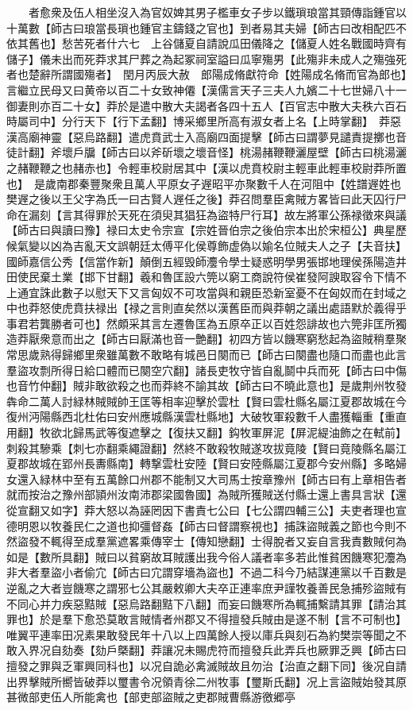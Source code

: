 　　者愈衆及伍人相坐沒入為官奴婢其男子檻車女子步以鐵瑣琅當其頸傳詣鍾官以十萬數【師古曰琅當長瑣也鍾官主鑄錢之官也】到者易其夫婦【師古曰改相配匹不依其舊也】愁苦死者什六七　上谷儲夏自請說瓜田儀降之【儲夏人姓名戰國時齊有儲子】儀未出而死莽求其尸葬之為起冢祠室謚曰瓜寧殤男【此殤非未成人之殤強死者也楚辭所謂國殤者】　閏月丙辰大赦　郎陽成脩獻符命【姓陽成名脩而官為郎也】言繼立民母又曰黄帝以百二十女致神僊【漢儒言天子三夫人九嬪二十七世婦八十一御妻則亦百二十女】莽於是遣中散大夫謁者各四十五人【百官志中散大夫秩六百石時屬司中】分行天下【行下孟翻】博采鄉里所高有淑女者上名【上時掌翻】　莽惡漢高廟神靈【惡烏路翻】遣虎賁武士入高廟四面提擊【師古曰謂夢見譴責提擲也音徒計翻】斧壞戶牖【師古曰以斧斫壞之壞音怪】桃湯赭鞭鞭灑屋壁【師古曰桃湯灑之赭鞭鞭之也赭赤也】令輕車校尉居其中【漢以虎賁校尉主輕車此輕車校尉莽所置也】　是歲南郡秦豐聚衆且萬人平原女子遟昭平亦聚數千人在河阻中【姓譜遟姓也樊遟之後以王父字為氏一曰古賢人遟任之後】莽召問羣臣禽賊方畧皆曰此天囚行尸命在漏刻【言其得罪於天死在須臾其猖狂為盜特尸行耳】故左將軍公孫禄徵來與議【師古曰與讀曰豫】禄曰太史令宗宣【宗姓晉伯宗之後伯宗本出於宋桓公】典星歷候氣變以凶為吉亂天文誤朝廷太傅平化侯尊飾虚偽以媮名位賊夫人之子【夫音扶】國師嘉信公秀【信當作新】顛倒五經毁師灋令學士疑惑明學男張邯地理侯孫陽造井田使民棄土業【邯下甘翻】羲和魯匡設六筦以窮工商說符侯崔發阿諛取容令下情不上通宜誅此數子以慰天下又言匈奴不可攻當與和親臣恐新室憂不在匈奴而在封域之中也莽怒使虎賁扶禄出【禄之言則直矣然以漢舊臣而與莽朝之議出處語默於義得乎事君若龔勝者可也】然頗采其言左遷魯匡為五原卒正以百姓怨誹故也六筦非匡所獨造莽厭衆意而出之【師古曰厭滿也音一艶翻】初四方皆以饑寒窮愁起為盜賊稍羣聚常思歲熟得歸鄉里衆雖萬數不敢略有城邑日闋而已【師古曰闋盡也隨口而盡也此言羣盜攻剽所得日給口體而已闋空穴翻】諸長吏牧守皆自亂鬬中兵而死【師古曰中傷也音竹仲翻】賊非敢欲殺之也而莽終不諭其故【師古曰不曉此意也】是歲荆州牧發犇命二萬人討緑林賊賊帥王匡等相率迎擊於雲杜【賢曰雲杜縣名屬江夏郡故城在今復州沔陽縣西北杜佑曰安州應城縣漢雲杜縣地】大破牧軍殺數千人盡獲輜重【重直用翻】牧欲北歸馬武等復遮擊之【復扶又翻】鈎牧軍屏泥【屏泥緹油飾之在軾前】刺殺其驂乘【刺七亦翻乘繩證翻】然終不敢殺牧賊遂攻拔竟陵【賢曰竟陵縣名屬江夏郡故城在郢州長夀縣南】轉撃雲杜安陸【賢曰安陸縣屬江夏郡今安州縣】多略婦女還入緑林中至有五萬餘口州郡不能制又大司馬士按章豫州【師古曰有上章相告者就而按治之豫州部頴州汝南沛郡梁國魯國】為賊所獲賊送付縣士還上書具言狀【還從宣翻又如字】莽大怒以為誣罔因下書責七公曰【七公謂四輔三公】夫吏者理也宣德明恩以牧養民仁之道也抑彊督姦【師古曰督謂察視也】捕誅盜賊義之節也今則不然盜發不輒得至成羣黨遮畧乘傳宰士【傳知戀翻】士得脫者又妄自言我責數賊何為如是【數所具翻】賊曰以貧窮故耳賊護出我今俗人議者率多若此惟貧困饑寒犯灋為非大者羣盜小者偷宂【師古曰宂謂穿墻為盜也】不過二科今乃結謀連黨以千百數是逆亂之大者豈饑寒之謂邪七公其嚴敕卿大夫卒正連率庶尹謹牧養善民急捕殄盜賊有不同心并力疾惡黠賊【惡烏路翻黠下八翻】而妄曰饑寒所為輒捕繫請其罪【請治其罪也】於是羣下愈恐莫敢言賊情者州郡又不得擅發兵賊由是遂不制【言不可制也】唯翼平連率田况素果敢發民年十八以上四萬餘人授以庫兵與刻石為約樊崇等聞之不敢入界况自劾奏【劾戶槩翻】莽讓况未賜虎符而擅發兵此弄兵也厥罪乏興【師古曰擅發之罪與乏軍興同科也】以况自詭必禽滅賊故且勿治【治直之翻下同】後况自請出界擊賊所嚮皆破莽以璽書令况領青徐二州牧事【璽斯氏翻】况上言盜賊始發其原甚微部吏伍人所能禽也【部吏部盜賊之吏郡賊曹縣游徼郷亭